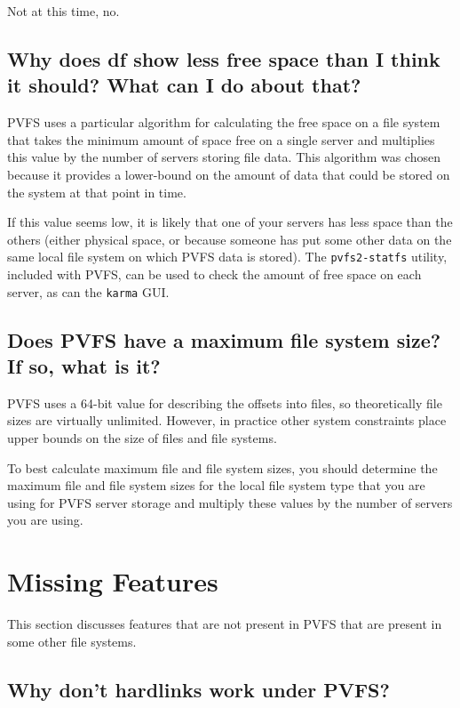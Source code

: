 \documentclass[11pt,letterpaper]{article}
\begin{document}
Not at this time, no.

\subsection{Why does df show less free space than I think it should? What
            can I do about that?}
\label{sec:df-free-space}

PVFS uses a particular algorithm for calculating the free space on a file
system that takes the minimum amount of space free on a single server and
multiplies this value by the number of servers storing file data.
%
This algorithm was chosen because it provides a lower-bound on the amount of
data that could be stored on the system at that point in time.

If this value seems low, it is likely that one of your servers has less space
than the others (either physical space, or because someone has put some other
data on the same local file system on which PVFS data is stored).  The
\texttt{pvfs2-statfs} utility, included with PVFS, can be used to check the
amount of free space on each server, as can the \texttt{karma} GUI.

\subsection{Does PVFS have a maximum file system size? If so, what is it?}

PVFS uses a 64-bit value for describing the offsets into files, so
theoretically file sizes are virtually unlimited.  However, in practice other
system constraints place upper bounds on the size of files and file systems.

To best calculate maximum file and file system sizes, you should determine the
maximum file and file system sizes for the local file system type that you are
using for PVFS server storage and multiply these values by the number of
servers you are using.

%
%
\section{Missing Features}

This section discusses features that are not present in PVFS that are present
in some other file systems.

\subsection{Why don't hardlinks work under PVFS?}
\end{document}
